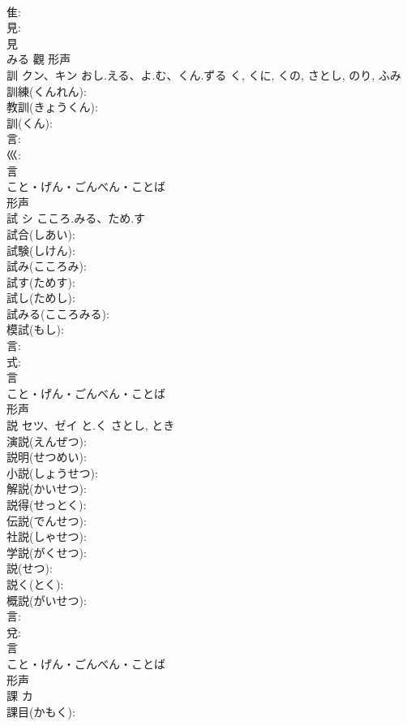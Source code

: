 \documentclass[8pt]{extreport}
\begin{document}
\begin{CJK}{UTF8}{min}
\\	隹: 
\\	見: 
\\	見	
\\	みる	觀	形声 
\\	訓	クン、キン	おし.える、よ.む、くん.ずる	く, くに, くの, さとし, のり, ふみ	
\\	訓練(くんれん): 
\\	教訓(きょうくん): 
\\	訓(くん): 
\\	言: 
\\	巛: 
\\	言	
\\	こと・げん・ごんべん・ことば	
\\	形声 
\\	試	シ	こころ.みる、ため.す		
\\	試合(しあい): 
\\	試験(しけん): 
\\	試み(こころみ): 
\\	試す(ためす): 
\\	試し(ためし): 
\\	試みる(こころみる): 
\\	模試(もし): 
\\	言: 
\\	式: 
\\	言	
\\	こと・げん・ごんべん・ことば	
\\	形声 
\\	説	セツ、ゼイ	と.く	さとし, とき	
\\	演説(えんぜつ): 
\\	説明(せつめい): 
\\	小説(しょうせつ): 
\\	解説(かいせつ): 
\\	説得(せっとく): 
\\	伝説(でんせつ): 
\\	社説(しゃせつ): 
\\	学説(がくせつ): 
\\	説(せつ): 
\\	説く(とく): 
\\	概説(がいせつ): 
\\	言: 
\\	兌: 
\\	言	
\\	こと・げん・ごんべん・ことば	
\\	形声 
\\	課	カ			
\\	課目(かもく): 

\end{CJK}
\end{document}
